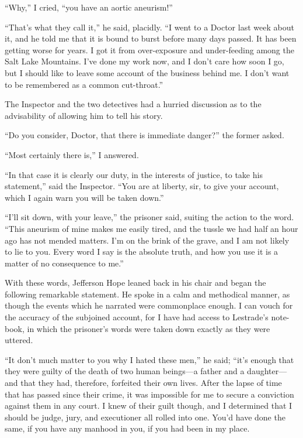 \documentclass[12pt,english,oneside]{book}
\newcommand{\mdsh}[1]{\mbox{#1}\linebreak[1]}
\begin{document}
{}``Why,'' I cried, {}``you have an aortic aneurism!''

{}``That's what they call it,'' he said, placidly. {}``I went to
a Doctor last week about it, and he told me that it is bound to burst
before many days passed. It has been getting worse for years. I got
it from over-exposure and under-feeding among the Salt Lake Mountains.
I've done my work now, and I don't care how soon I go, but I should
like to leave some account of the business behind me. I don't want
to be remembered as a common cut-throat.''

The Inspector and the two detectives had a hurried discussion as to
the advisability of allowing him to tell his story.

{}``Do you consider, Doctor, that there is immediate danger?'' the
former asked.

{}``Most certainly there is,'' I answered.

{}``In that case it is clearly our duty, in the interests of justice,
to take his statement,'' said the Inspector. {}``You are at liberty,
sir, to give your account, which I again warn you will be taken down.''

{}``I'll sit down, with your leave,'' the prisoner said, suiting
the action to the word. {}``This aneurism of mine makes me easily
tired, and the tussle we had half an hour ago has not mended matters.
I'm on the brink of the grave, and I am not likely to lie to you.
Every word I say is the absolute truth, and how you use it is a matter
of no consequence to me.''

With these words, Jefferson Hope leaned back in his chair and began
the following remarkable statement. He spoke in a calm and methodical
manner, as though the events which he narrated were commonplace enough.
I can vouch for the accuracy of the subjoined account, for I have
had access to Lestrade's note-book, in which the prisoner's words
were taken down exactly as they were uttered.

{}``It don't much matter to you why I hated these men,'' he said;
{}``it's enough that they were guilty of the death of two human beings\mdsh{---}a
father and a daughter\mdsh{---}and that they had, therefore, forfeited
their own lives. After the lapse of time that has passed since their
crime, it was impossible for me to secure a conviction against them
in any court. I knew of their guilt though, and I determined that
I should be judge, jury, and executioner all rolled into one. You'd
have done the same, if you have any manhood in you, if you had been
in my place.
\end{document}
